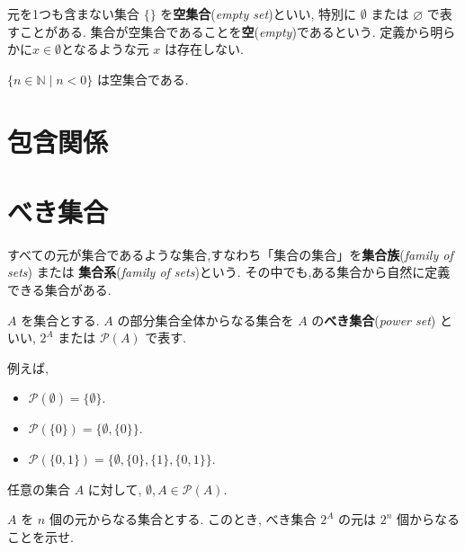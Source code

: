 元を1つも含まない集合 $\{\}$ を\textbf{空集合}(\textit{empty set})といい, 特別に $\emptyset$ または $\varnothing$ で表すことがある.
集合が空集合であることを\textbf{空}(\textit{empty})であるという.
定義から明らかに$x\in\emptyset$となるような元 $x$ は存在しない.

\begin{exa}
    $\{n\in\mathbb{N}\mid n<0\}$ は空集合である.
\end{exa}

\section{包含関係}

\section{べき集合}

すべての元が集合であるような集合,すなわち「集合の集合」を\textbf{集合族}(\textit{family of sets}) または \textbf{集合系}(\textit{family of sets})という.
その中でも,ある集合から自然に定義できる集合がある.

\begin{framed}
    \begin{dfn}[べき集合]
        $A$ を集合とする. $A$ の部分集合全体からなる集合を $A$ の\textbf{べき集合}(\textit{power set}) といい, $2^A$ または $\mathcal{P}(A)$ で表す.
    \end{dfn}
\end{framed}


\begin{exa}
    例えば,
    \begin{itemize}
        \item $\mathcal{P}(\emptyset) = \{\emptyset\}.$
        \item $\mathcal{P}(\{0\}) = \{\emptyset, \{0\}\}.$
        \item $\mathcal{P}(\{0,1\}) = \{\emptyset, \{0\}, \{1\}, \{0, 1\}\}.$
    \end{itemize}
\end{exa}

\begin{exa}
    任意の集合 $A$ に対して, $\emptyset,A\in\mathcal{P}(A).$
\end{exa}

 $A$ を $n$ 個の元からなる集合とする. このとき, べき集合 $2^A$ の元は $2^n$ 個からなることを示せ.


